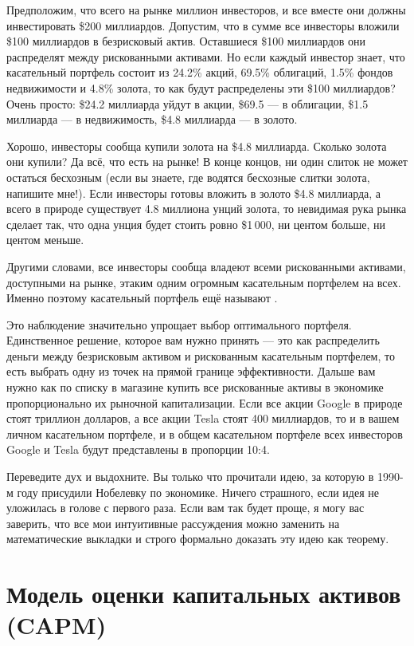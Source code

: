 Предположим, что всего на рынке миллион инвесторов, и все вместе они должны инвестировать \$200 миллиардов. Допустим, что в сумме все инвесторы вложили \$100 миллиардов в безрисковый актив. Оставшиеся \$100 миллиардов они распределят между рискованными активами. Но если каждый инвестор знает, что касательный портфель состоит из 24.2\% акций, 69.5\% облигаций, 1.5\% фондов недвижимости и 4.8\% золота, то как будут распределены эти \$100 миллиардов? Очень просто: \$24.2 миллиарда уйдут в акции, \$69.5 --- в облигации, \$1.5 миллиарда --- в недвижимость, \$4.8 миллиарда --- в золото.

Хорошо, инвесторы сообща купили золота на \$4.8 миллиарда. Сколько золота они купили? Да всё, что есть на рынке! В конце концов, ни один слиток не может остаться бесхозным (если вы знаете, где водятся бесхозные слитки золота, напишите мне!). Если инвесторы готовы вложить в золото \$4.8 миллиарда, а всего в природе существует 4.8 миллиона унций золота, то невидимая рука рынка сделает так, что одна унция будет стоить ровно \$1\,000, ни центом больше, ни центом меньше.

Другими словами, все инвесторы сообща владеют всеми рискованными активами, доступными на рынке, этаким одним огромным касательным портфелем на всех. Именно поэтому касательный портфель ещё называют .

Это наблюдение значительно упрощает выбор оптимального портфеля. Единственное решение, которое вам нужно принять --- это как распределить деньги между безрисковым активом и рискованным касательным портфелем, то есть выбрать одну из точек на прямой границе эффективности. Дальше вам нужно как по списку в магазине купить все рискованные активы в экономике пропорционально их рыночной капитализации. Если все акции Google в природе стоят триллион долларов, а все акции Tesla стоят 400 миллиардов, то и в вашем личном касательном портфеле, и в общем касательном портфеле всех инвесторов Google и Tesla будут представлены в пропорции 10:4.

Переведите дух и выдохните. Вы только что прочитали идею, за которую в 1990-м году  присудили Нобелевку по экономике. Ничего страшного, если идея не уложилась в голове с первого раза. Если вам так будет проще, я могу вас заверить, что все мои интуитивные рассуждения можно заменить на математические выкладки и строго формально доказать эту идею как теорему.

\section*{Модель оценки капитальных активов (CAPM)}

